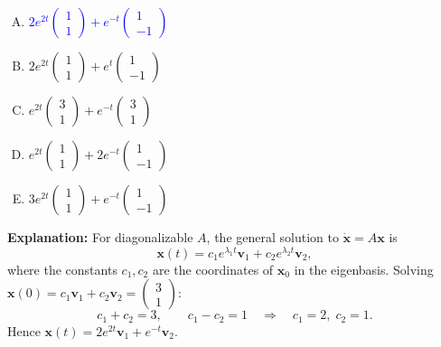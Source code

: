 \documentclass[12pt]{amsart}
\begin{document}
\begin{enumerate}[(A)]
\item \textcolor{blue}{\textbf{$2 e^{2t} \begin{pmatrix} 1 \\ 1 \end{pmatrix} + e^{-t} \begin{pmatrix} 1 \\ -1 \end{pmatrix}$}}
\item $2 e^{2t} \begin{pmatrix} 1 \\ 1 \end{pmatrix} + e^{t} \begin{pmatrix} 1 \\ -1 \end{pmatrix}$
\item $e^{2t} \begin{pmatrix} 3 \\ 1 \end{pmatrix} + e^{-t} \begin{pmatrix} 3 \\ 1 \end{pmatrix}$
\item $e^{2t} \begin{pmatrix} 1 \\ 1 \end{pmatrix} + 2 e^{-t} \begin{pmatrix} 1 \\ -1 \end{pmatrix}$
\item $3 e^{2t} \begin{pmatrix} 1 \\ 1 \end{pmatrix} + e^{-t} \begin{pmatrix} 1 \\ -1 \end{pmatrix}$
\end{enumerate}

\textbf{Explanation:}
For diagonalizable $A$, the general solution to $\dot{\mathbf{x}} = A\mathbf{x}$
is
\[
\mathbf{x}(t) = c_1 e^{\lambda_1 t}\mathbf{v}_1 + c_2 e^{\lambda_2 t}\mathbf{v}_2,
\]
where the constants $c_1, c_2$ are the coordinates of $\mathbf{x}_0$ in the
eigenbasis. Solving $\mathbf{x}(0) = c_1 \mathbf{v}_1 + c_2 \mathbf{v}_2 = \begin{pmatrix} 3 \\ 1 \end{pmatrix}$:
\[
c_1 + c_2 = 3, \qquad c_1 - c_2 = 1 \quad \Longrightarrow \quad c_1 = 2, \; c_2 = 1.
\]
Hence $\mathbf{x}(t) = 2 e^{2t}\mathbf{v}_1 + e^{-t}\mathbf{v}_2$.
\end{document}
